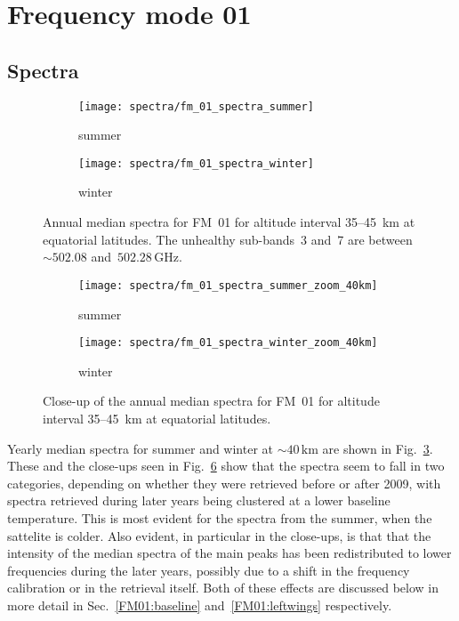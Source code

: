 \section{Frequency mode 01}
\label{FM01}

\subsection{Spectra}
\label{FM01:spectra}

\begin{figure}[ht]
    \centering
    \begin{subfigure}[b]{0.9545\textwidth}
        \texttt{[image: spectra/fm\_01\_spectra\_summer]}
        \caption{summer}\label{fig:spectra:01:summer}
    \end{subfigure}
    \begin{subfigure}[b]{0.9545\textwidth}
        \texttt{[image: spectra/fm\_01\_spectra\_winter]}
        \caption{winter}\label{fig:spectra:01:winter}
    \end{subfigure}
    \caption{Annual median spectra for FM~01 for altitude interval 35--45~km at
        equatorial latitudes. The unhealthy sub-bands~3 and~7 are between
        $\sim502.08$ and~$502.28\,\mathrm{GHz}$.
        }\label{fig:spectra:01}
\end{figure}

\begin{figure}[ht]
    \centering
    \begin{subfigure}[b]{0.9545\textwidth}
        \texttt{[image: spectra/fm\_01\_spectra\_summer\_zoom\_40km]}
        \caption{summer}\label{fig:spectra:01:summer:closeup}
    \end{subfigure}
    \begin{subfigure}[b]{0.9545\textwidth}
        \texttt{[image: spectra/fm\_01\_spectra\_winter\_zoom\_40km]}
        \caption{winter}\label{fig:spectra:01:winter:closeup}
    \end{subfigure}
    \caption{Close-up of the annual median spectra for FM~01 for altitude
        interval 35--45~km at equatorial latitudes.
        }\label{fig:spectra:01:closeup}
\end{figure}

\noindent
Yearly median spectra for summer and winter at $\sim40\,\mathrm{km}$ are shown
in Fig.~\ref{fig:spectra:01}.  These and the close-ups seen in
Fig.~\ref{fig:spectra:01:closeup} show that the spectra seem to fall in two
categories, depending on whether they were retrieved before or after 2009, with
spectra retrieved during later years being clustered at a lower baseline
temperature.  This is most evident for the spectra from the summer, when the
sattelite is colder.  Also evident, in particular in the close-ups, is that
that the intensity of the median spectra of the main peaks has been
redistributed to lower frequencies during the later years, possibly due to a
shift in the frequency calibration or in the retrieval itself.  Both of these
effects are discussed below in more detail in Sec.~\ref{FM01:baseline}
and~\ref{FM01:leftwings} respectively.


